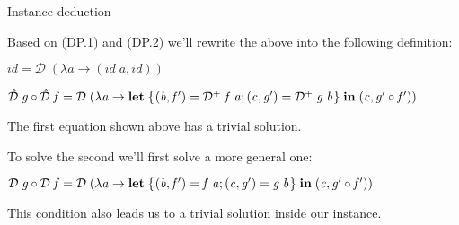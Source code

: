 \documentclass{beamer}
\theoremstyle{definition}
\theoremstyle{definition}
\theoremstyle{theorem}
\newcommand{\Varid}[1]{\mathit{#1}}
\begin{document}
\begin{frame}{Instance deduction}

Based on  (DP.1) and (DP.2) we'll rewrite the above into the following definition:

\ensuremath{\Varid{id}\mathrel{=}\mathcal{D}\;(\lambda \Varid{a}\rightarrow (\Varid{id}\;\Varid{a},\Varid{id}))}

\ensuremath{\mathcal{\hat{D}}\;\Varid{g}\mathbin{\circ}\mathcal{\hat{D}}\;\Varid{f}\mathrel{=}\mathcal{D}\;(\lambda \Varid{a}\rightarrow \mathbf{let}\;\{\mskip1.5mu (\Varid{b},\Varid{f'})\mathrel{=}\mathcal{D}^{+}\;\Varid{f}\;\Varid{a};(\Varid{c},\Varid{g'})\mathrel{=}\mathcal{D}^{+}\;\Varid{g}\;\Varid{b}\mskip1.5mu\}\;\mathbf{in}\;(\Varid{c},\Varid{g'}\mathbin{\circ}\Varid{f'}))}
\vspace{5mm}

\pause
The first equation shown above has a trivial solution.
\vspace{3mm}

\pause
To solve the second we'll first solve a more general one:

\ensuremath{\mathcal{D}\;\Varid{g}\mathbin{\circ}\mathcal{D}\;\Varid{f}\mathrel{=}\mathcal{D}\;(\lambda \Varid{a}\rightarrow \mathbf{let}\;\{\mskip1.5mu (\Varid{b},\Varid{f'})\mathrel{=}\Varid{f}\;\Varid{a};(\Varid{c},\Varid{g'})\mathrel{=}\Varid{g}\;\Varid{b}\mskip1.5mu\}\;\mathbf{in}\;(\Varid{c},\Varid{g'}\mathbin{\circ}\Varid{f'}))}

This condition also leads us to a trivial solution inside our instance.

\end{frame}
\end{document}
